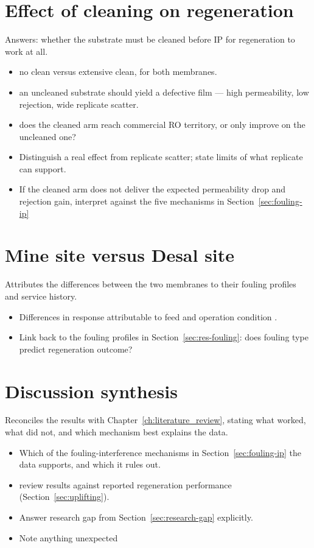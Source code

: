 \section{Effect of cleaning on regeneration}
\label{sec:res-cleaning-effect}
Answers: whether the substrate must be cleaned before IP for regeneration to work at all.

\begin{itemize}
  \item no clean versus extensive clean, for both membranes.
  \item an uncleaned substrate should yield a defective film --- high permeability, low rejection, wide replicate scatter.
  \item does the cleaned arm reach commercial RO territory, or only improve on the uncleaned one? 
  \item Distinguish a real effect from replicate scatter; state  limits of what replicate can support.
  \item If the cleaned arm does not deliver the expected permeability drop and rejection gain, interpret  against the five mechanisms in Section~\ref{sec:fouling-ip}
\end{itemize}


\section{Mine site versus Desal site}
\label{sec:res-a-vs-c}
Attributes the differences between the two membranes to their fouling profiles and service history.

\begin{itemize}
  \item Differences in response attributable to feed and operation condition .
  \item Link back to the fouling profiles in Section~\ref{sec:res-fouling}: does fouling type predict regeneration outcome?
\end{itemize}


\section{Discussion synthesis}
\label{sec:res-synthesis}
Reconciles the results with Chapter~\ref{ch:literature_review}, stating what worked, what did not, and which mechanism best explains the data.

\begin{itemize}
  \item Which of the fouling-interference mechanisms in Section~\ref{sec:fouling-ip} the data supports, and which it rules out.
  \item review results against reported regeneration performance (Section~\ref{sec:uplifting}).
  \item Answer research gap from Section~\ref{sec:research-gap} explicitly.
  \item Note anything unexpected
\end{itemize}


